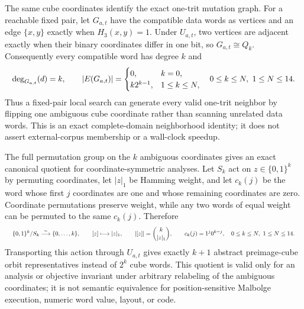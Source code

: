 \documentclass{article}
\newcommand{\fitmath}[1]{\resizebox{0.99\linewidth}{!}{$\displaystyle #1$}}
\begin{document}
The same cube coordinates identify the exact one-trit mutation graph. For a
reachable fixed pair, let $G_{a,t}$ have the compatible data words as vertices
and an edge $\{x,y\}$ exactly when $H_3(x,y)=1$. Under $U_{a,t}$, two vertices
are adjacent exactly when their binary coordinates differ in one bit, so
$G_{a,t}\cong Q_k$. Consequently every compatible word has degree $k$ and
\begin{equation}
  \fitmath{%
    \deg_{G_{a,t}}(d)=k,\qquad
    |E(G_{a,t})|=
    \begin{cases}
      0, & k=0,\\
      k2^{k-1}, & 1\leq k\leq N,
    \end{cases}
    \quad 0\leq k\leq N,\ 1\leq N\leq14.
  }
  \label{eq:optimization-crazy-profile-preimage-cube-graph}
\end{equation}
Thus a fixed-pair local search can generate every valid one-trit neighbor by
flipping one ambiguous cube coordinate rather than scanning unrelated data
words. This is an exact complete-domain neighborhood identity; it does not
assert external-corpus membership or a wall-clock speedup.

The full permutation group on the $k$ ambiguous coordinates gives an exact
canonical quotient for coordinate-symmetric analyses. Let $S_k$ act on
$z\in\{0,1\}^k$ by permuting coordinates, let $|z|_1$ be Hamming weight, and
let $c_k(j)$ be the word whose first $j$ coordinates are one and whose remaining
coordinates are zero. Coordinate permutations preserve weight, while any two
words of equal weight can be permuted to the same $c_k(j)$. Therefore
\begin{equation}
  \fitmath{%
    \{0,1\}^k/S_k \overset{\sim}{\longrightarrow} \{0,\ldots,k\},
    \qquad [z]\longmapsto |z|_1,
    \qquad |[z]|=\binom{k}{|z|_1},
    \qquad c_k(j)=1^j0^{k-j},
    \quad 0\leq k\leq N,\ 1\leq N\leq14.
  }
  \label{eq:optimization-crazy-profile-preimage-cube-permutation-quotient}
\end{equation}
Transporting this action through $U_{a,t}$ gives exactly $k+1$ abstract
preimage-cube orbit representatives instead of $2^k$ cube words. This quotient
is valid only for an analysis or objective invariant under arbitrary relabeling
of the ambiguous coordinates; it is not semantic equivalence for
position-sensitive Malbolge execution, numeric word value, layout, or code.
\end{document}
